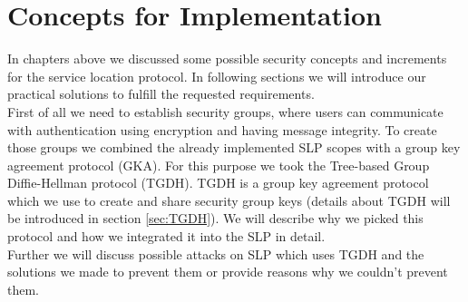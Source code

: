 \newpage
\section{Concepts for Implementation}\label{sec:concepts}
In chapters above we discussed some possible security concepts and increments for the service location protocol. In following sections we will introduce our practical solutions to fulfill the requested requirements.\\
First of all we need to establish security groups, where users can communicate with authentication using encryption and having message integrity. To create those groups we combined the already implemented SLP scopes with a group key agreement protocol (GKA). For this purpose we took the Tree-based Group Diffie-Hellman protocol (TGDH). TGDH is a group key agreement protocol which we use to create and share security group keys (details about TGDH will be introduced in section \ref{sec:TGDH}). We will describe why we picked this protocol and how we integrated it into the SLP in detail.\\
Further we will discuss possible attacks on SLP which uses TGDH and the solutions we made to prevent them or provide reasons why we couldn't prevent them.

